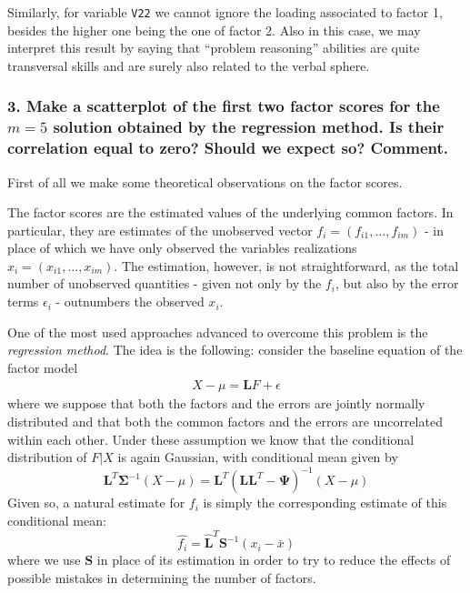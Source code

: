 \documentclass[
  letterpaper,
  DIV=11,
  numbers=noendperiod]{scrartcl}
\begin{document}
Similarly, for variable \texttt{V22} we cannot ignore the loading
associated to factor 1, besides the higher one being the one of factor
2. Also in this case, we may interpret this result by saying that
``problem reasoning'' abilities are quite transversal skills and are
surely also related to the verbal sphere.

\hypertarget{make-a-scatterplot-of-the-first-two-factor-scores-for-the-m-5-solution-obtained-by-the-regression-method.-is-their-correlation-equal-to-zero-should-we-expect-so-comment.}{%
\subsubsection{\texorpdfstring{3. Make a scatterplot of the first two
factor scores for the \(m = 5\) solution obtained by the regression
method. Is their correlation equal to zero? Should we expect so?
Comment.}{3. Make a scatterplot of the first two factor scores for the m = 5 solution obtained by the regression method. Is their correlation equal to zero? Should we expect so? Comment.}}\label{make-a-scatterplot-of-the-first-two-factor-scores-for-the-m-5-solution-obtained-by-the-regression-method.-is-their-correlation-equal-to-zero-should-we-expect-so-comment.}}

First of all we make some theoretical observations on the factor scores.

The factor scores are the estimated values of the underlying common
factors. In particular, they are estimates of the unobserved vector
\(f_i = (f_{i1}, \dots, f_{im})\) - in place of which we have only
observed the variables realizations \(x_i = (x_{i1}, \dots, x_{im})\).
The estimation, however, is not straightforward, as the total number of
unobserved quantities - given not only by the \(f_i\), but also by the
error terms \(\epsilon_i\) - outnumbers the observed \(x_i\).

One of the most used approaches advanced to overcome this problem is the
\emph{regression method}. The idea is the following: consider the
baseline equation of the factor model 
\begin{align}
  X - \mu = \mathbf{L}F + \epsilon
  \end{align}
 where we suppose that both the factors and the errors are jointly
normally distributed and that both the common factors and the errors are
uncorrelated within each other. Under these assumption we know that the
conditional distribution of \(F|X\) is again Gaussian, with conditional
mean given by \[
 \mathbf{L}^T\mathbf{\Sigma}^{-1}(X-\mu) = \mathbf{L}^T(\mathbf{LL}^T -\mathbf{\Psi})^{-1}(X-\mu)
\] Given so, a natural estimate for \(f_i\) is simply the corresponding
estimate of this conditional mean: \[
\hat{f_i} = \hat{\mathbf{L}}^T\mathbf{S}^{-1}(x_i-\bar{x})
\] where we use \(\mathbf{S}\) in place of its estimation in order to
try to reduce the effects of possible mistakes in determining the number
of factors.
\end{document}
